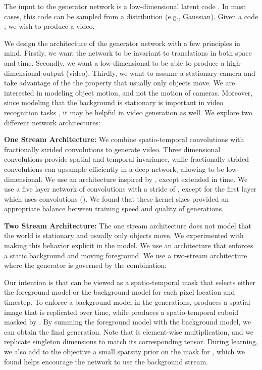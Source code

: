 \documentclass{article}
\begin{document}
The input to the generator network is a low-dimensional latent code . In most cases, this code can be sampled from a distribution (e.g., Gaussian). Given a code , we wish to produce a video.

We design the architecture of the generator network with a few principles in mind. Firstly, we want the network to be invariant to translations in both space and time. Secondly, we want a low-dimensional  to be able to produce a high-dimensional output (video). Thirdly, we want to assume a stationary camera and take advantage of the the property that usually only objects move. We are interested in modeling object motion, and not the motion of cameras. Moreover, since modeling that the background is stationary is important in video recognition tasks \cite{wang2013action}, it may be helpful in video generation as well. We explore two different network architectures:

\textbf{One Stream Architecture:} We combine spatio-temporal convolutions \cite{ji20133d,tran2014learning} with fractionally strided convolutions \cite{zeiler2010deconvolutional,radford2015unsupervised} to generate video. Three dimensional convolutions provide spatial and temporal invariance, while fractionally strided convolutions can upsample efficiently in a deep network, allowing  to be low-dimensional. We use an architecture inspired by \cite{radford2015unsupervised}, except extended in time. We use a five layer network of  convolutions with a stride of , except for the first layer which uses  convolutions (). We found that these kernel sizes provided an appropriate balance between training speed and quality of generations. 

\textbf{Two Stream Architecture:} The one stream architecture does not model that the world is stationary and usually only objects move. We experimented with making this behavior explicit in the model. We use an architecture that enforces a static background and moving foreground. We use a two-stream architecture where the generator is governed by the combination:

Our intention is that 
 can be viewed as a spatio-temporal mask that selects either the foreground  model or the background model  for each pixel location and timestep. To enforce a background model in the generations,  produces a spatial image that is replicated over time, while  produces a spatio-temporal cuboid masked by . By summing the foreground model with the background model, we can obtain the final generation. Note that  is element-wise multiplication, and we replicate singleton dimensions to match its corresponding tensor. During learning, we also add to the objective a small sparsity prior on the mask  for , which we found helps encourage the network to use the background stream. 
\end{document}
